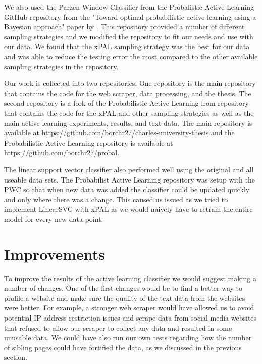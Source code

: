 We also used the Parzen Window Classifier from the Probalistic Active Learning GitHub repository from the "Toward optimal probabilistic active learning using a Bayesian approach" paper by \cite{kottke2021toward}. This repository provided a number of different sampling strategies and we modified the repository to fit our needs and use with our data. We found that the xPAL sampling strategy was the best for our data and was able to reduce the testing error the most compared to the other available sampling strategies in the repository.

Our work is collected into two repositories. One repository is the main repository that contains the code for the web scraper, data processing, and the thesis. The second repository is a fork of the Probabilistic Active Learning from \cite{kottke2021toward} repository that contains the code for the xPAL and other sampling strategies as well as the main active learning experiments, results, and text data. The main repository is available at \url{https://github.com/borchr27/charles-university-thesis} and the Probabilistic Active Learning repository is available at \url{https://github.com/borchr27/probal}.

The linear support vector classifier also performed well using the original and all useable data sets. The Probabilist Active Learning repository was setup with the PWC so that when new data was added the classifier could be updated quickly and only where there was a change. This caused us issued as we tried to implement LinearSVC with xPAL as we would naively have to retrain the entire model for every new data point. 

\section*{Improvements}

To improve the results of the active learning classifier we would suggest making a number of changes. One of the first changes would be to find a better way to profile a website and make sure the quality of the text data from the websites were better. For example, a stronger web scraper would have allowed us to avoid potential IP address restriction issues and scrape data from social media websites that refused to allow our scraper to collect any data and resulted in some unusable data. We could have also run our own tests regarding how the number of sibling pages could have fortified the data, as we discussed in the previous section.

